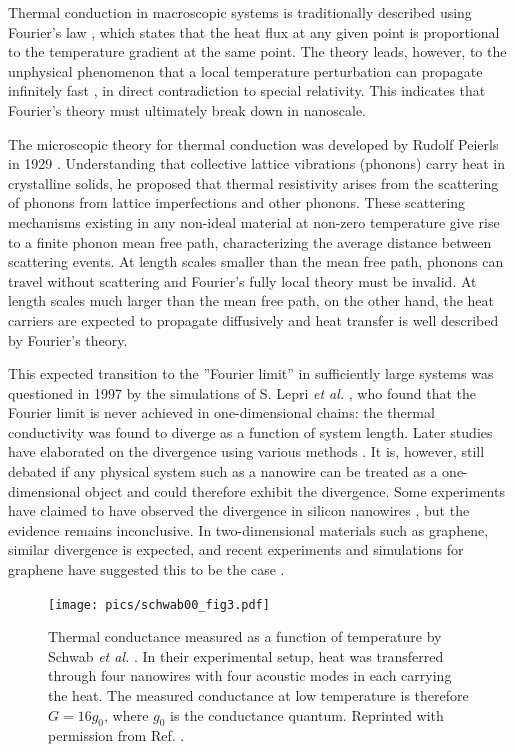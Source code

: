 Thermal conduction in macroscopic systems is traditionally described using Fourier's law \cite{}, which states that the heat flux at any given point is proportional to the temperature gradient at the same point. The theory leads, however, to the unphysical phenomenon that a local temperature perturbation can propagate infinitely fast \cite{chen}, in direct contradiction to special relativity. This indicates that Fourier's theory must ultimately break down in nanoscale.

The microscopic theory for thermal conduction was developed by Rudolf Peierls in 1929 \cite{}. Understanding that collective lattice vibrations (phonons) carry heat in crystalline solids, he proposed that thermal resistivity arises from the scattering of phonons from lattice imperfections and other phonons. These scattering mechanisms existing in any non-ideal material at non-zero temperature give rise to a finite phonon mean free path, characterizing the average distance between scattering events. At length scales smaller than the mean free path, phonons can travel without scattering and Fourier's fully local theory must be invalid. At length scales much larger than the mean free path, on the other hand, the heat carriers are expected to propagate diffusively and heat transfer is well described by Fourier's theory.

This expected transition to the ''Fourier limit'' in sufficiently large systems was questioned in 1997 by the simulations of S. Lepri \textit{et al.} \cite{lepri97}, who found that the Fourier limit is never achieved in one-dimensional chains: the thermal conductivity was found to diverge as a function of system length. Later studies have elaborated on the divergence using various methods \cite{narayan02,mai07}. It is, however, still debated \cite{} if any physical system such as a nanowire can be treated as a one-dimensional object and could therefore exhibit the divergence. Some experiments have claimed to have observed the divergence in silicon nanowires \cite{yang10}, but the evidence remains inconclusive. In two-dimensional materials such as graphene, similar divergence is expected, and recent experiments and simulations for graphene have suggested this to be the case \cite{xu14}. %

\begin{figure}
\begin{center}
 \texttt{[image: pics/schwab00\_fig3.pdf]}
 \caption{Thermal conductance measured as a function of temperature by Schwab \textit{et al.} \cite{schwab00}. In their experimental setup, heat was transferred through four nanowires with four acoustic modes in each carrying the heat. The measured conductance at low temperature is therefore $G=16g_0$, where $g_0$ is the conductance quantum. Reprinted with permission from Ref. \cite{schwab00}.}
\label{fig:intro_schwab}
\end{center}
\end{figure}

